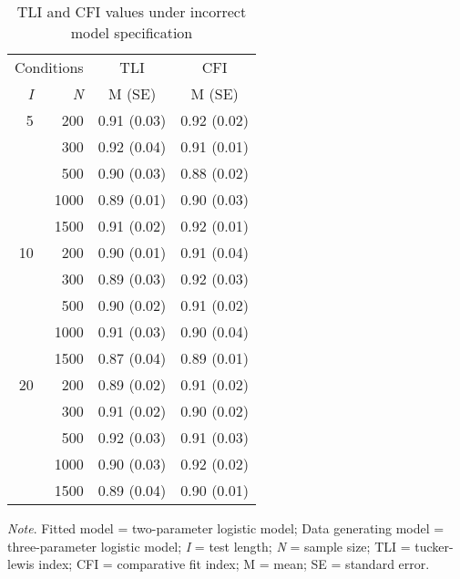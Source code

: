\documentclass[Royal,sageapa,times,doublespace]{Manuscript-Files/sagej}
\begin{document}
\begin{table}[ht]
\caption{TLI and CFI values under incorrect model specification}
\begin{tabular}{ r r | c c }
\toprule
\multicolumn{2}{c}{Conditions} & \multicolumn{1}{c}{TLI} & \multicolumn{1}{c}{CFI} \\
\textit{I} & \textit{N} & M (SE) & M (SE) \\
\midrule
 5 & 200 & 0.91 (0.03) & 0.92 (0.02) \\
& 300 & 0.92 (0.04) & 0.91 (0.01) \\
& 500 & 0.90 (0.03) & 0.88 (0.02) \\
& 1000 & 0.89 (0.01) & 0.90 (0.03)\\
& 1500 & 0.91 (0.02) & 0.92 (0.01)\\
10 & 200 & 0.90 (0.01) & 0.91 (0.04)\\
& 300 & 0.89 (0.03) & 0.92 (0.03)\\
& 500 & 0.90 (0.02) & 0.91 (0.02)\\
& 1000 & 0.91 (0.03) & 0.90 (0.04)\\
& 1500 & 0.87 (0.04) & 0.89 (0.01)\\
20 & 200 & 0.89 (0.02) & 0.91 (0.02)\\
& 300 & 0.91 (0.02) & 0.90 (0.02) \\
& 500 & 0.92 (0.03) & 0.91 (0.03)\\
& 1000 & 0.90 (0.03) & 0.92 (0.02)\\
& 1500 & 0.89 (0.04)& 0.90 (0.01)\\
\bottomrule
\end{tabular}

\bigskip
\small\textit{Note}. Fitted model = two-parameter logistic model; Data generating model = three-parameter logistic model; \textit{I} = test length; \textit{N} = sample size; TLI = tucker-lewis index; CFI = comparative fit index; M = mean; SE = standard error.
\label{tab:5}
\end{table}

\newpage

%
%
%
%
%

\newpage

\nocite{*}


\end{document}
